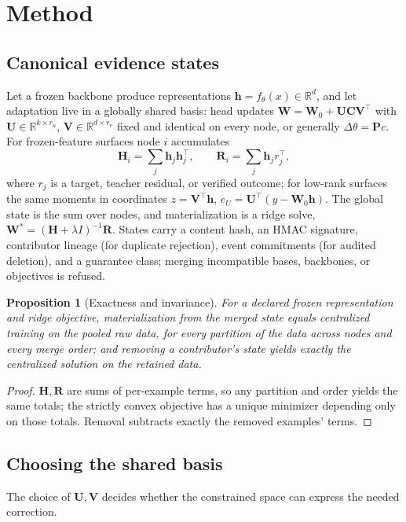 \documentclass[11pt]{article}
\newtheorem{proposition}{Proposition}
\newcommand{\bH}{\mathbf{H}}
\newcommand{\bR}{\mathbf{R}}
\newcommand{\bh}{\mathbf{h}}
\newcommand{\bW}{\mathbf{W}}
\newcommand{\bC}{\mathbf{C}}
\begin{document}
\section{Method}

\subsection{Canonical evidence states}
Let a frozen backbone produce representations $\bh=f_\theta(x)\in
\mathbb{R}^d$, and let adaptation live in a globally shared basis:
head updates $\bW=\bW_0+\mathbf{U}\bC\mathbf{V}^\top$ with
$\mathbf{U}\in\mathbb{R}^{k\times r_u}$,
$\mathbf{V}\in\mathbb{R}^{d\times r_v}$ fixed and identical on every
node, or generally $\Delta\theta=\mathbf{P}c$. For frozen-feature
surfaces node $i$ accumulates
\begin{equation}
\bH_i=\textstyle\sum_j \bh_j\bh_j^\top,\qquad
\bR_i=\textstyle\sum_j \bh_j r_j^\top,
\end{equation}
where $r_j$ is a target, teacher residual, or verified outcome; for
low-rank surfaces the same moments in coordinates
$z=\mathbf{V}^\top\bh$, $e_U=\mathbf{U}^\top(y-\bW_0\bh)$. The global
state is the sum over nodes, and materialization is a ridge solve,
$\bW^\ast=(\bH+\lambda I)^{-1}\bR$. States carry a content hash, an HMAC
signature, contributor lineage (for duplicate rejection), event
commitments (for audited deletion), and a guarantee class; merging
incompatible bases, backbones, or objectives is refused.

\begin{proposition}[Exactness and invariance]\label{prop:exact}
For a declared frozen representation and ridge objective, materialization
from the merged state equals centralized training on the pooled raw data,
for every partition of the data across nodes and every merge order; and
removing a contributor's state yields exactly the centralized solution on
the retained data.
\end{proposition}
\begin{proof}
$\bH,\bR$ are sums of per-example terms, so any partition and order
yields the same totals; the strictly convex objective has a unique
minimizer depending only on those totals. Removal subtracts exactly the
removed examples' terms.
\end{proof}

\subsection{Choosing the shared basis}\label{sec:basis}
The choice of $\mathbf{U},\mathbf{V}$ decides whether the constrained
space can express the needed correction.
\end{document}
